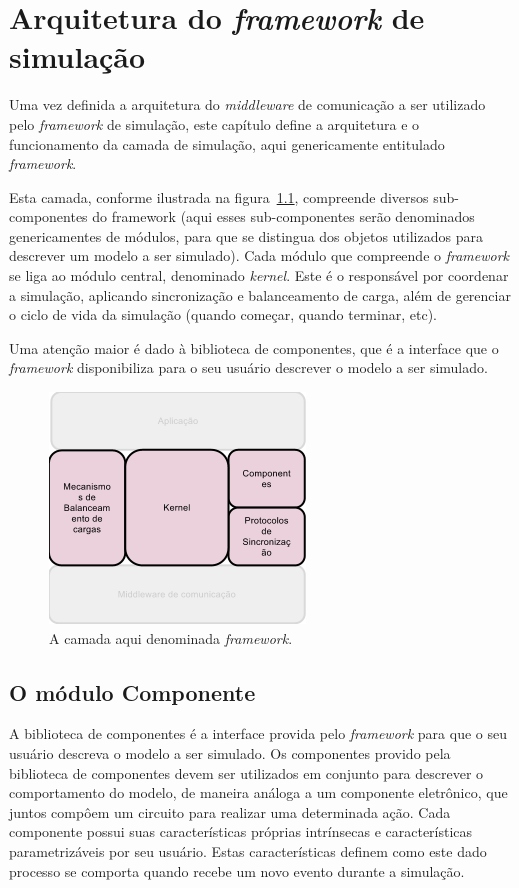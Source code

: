 \chapter{Arquitetura do \textit{framework} de simulação}

Uma vez definida a arquitetura do \textit{middleware} de comunicação a ser utilizado pelo \textit{framework} de simulação, este capítulo define a arquitetura e o funcionamento da camada de simulação, aqui genericamente entitulado \textit{framework}.

Esta camada, conforme ilustrada na figura~\ref{fig:camada_central}, compreende diversos sub-componentes do framework (aqui esses sub-componentes serão denominados genericamentes de módulos, para que se distingua dos objetos utilizados para descrever um modelo a ser simulado). Cada módulo que compreende o \textit{framework} se liga ao módulo central, denominado \textit{kernel}. Este é o responsável por coordenar a simulação, aplicando sincronização e balanceamento de carga, além de gerenciar o ciclo de vida da simulação (quando começar, quando terminar, etc).

Uma atenção maior é dado à biblioteca de componentes, que é a interface que o \textit{framework} disponibiliza para o seu usuário descrever o modelo a ser simulado.

\begin{figure}
  \centerline{\includegraphics{camada_framework.png}}
  \caption{A camada aqui denominada \textit{framework}.}
\label{fig:camada_central}
\end{figure}

\section{O módulo Componente}

A biblioteca de componentes é a interface provida pelo \textit{framework} para que o seu usuário descreva o modelo a ser simulado. Os componentes provido pela biblioteca de componentes devem ser utilizados em conjunto para descrever o comportamento do modelo, de maneira análoga a um componente eletrônico, que juntos compôem um circuito para realizar uma determinada ação. Cada componente possui suas características próprias intrínsecas e características parametrizáveis por seu usuário. Estas características definem como este dado processo se comporta quando recebe um novo evento durante a simulação.

